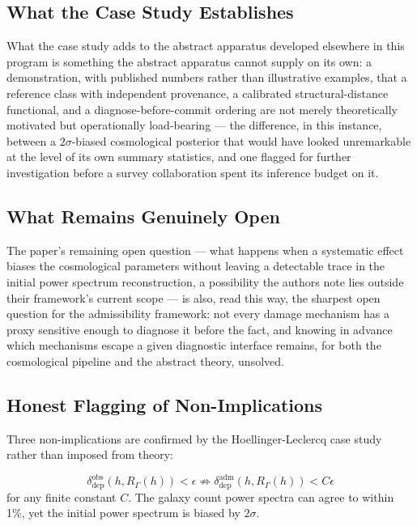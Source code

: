 \documentclass[11pt]{article}
\newcommand{\RGam}{R_\Gamma}
\newcommand{\dobs}{\delta_{\mathrm{dep}}^{\mathrm{obs}}}
\newcommand{\dadm}{\delta_{\mathrm{dep}}^{\mathrm{adm}}}
\begin{document}
\subsection{What the Case Study Establishes}

What the case study adds to the abstract apparatus developed elsewhere in this program is something the abstract apparatus cannot supply on its own: a demonstration, with published numbers rather than illustrative examples, that a reference class with independent provenance, a calibrated structural-distance functional, and a diagnose-before-commit ordering are not merely theoretically motivated but operationally load-bearing --- the difference, in this instance, between a $2\sigma$-biased cosmological posterior that would have looked unremarkable at the level of its own summary statistics, and one flagged for further investigation before a survey collaboration spent its inference budget on it.

\subsection{What Remains Genuinely Open}

The paper's remaining open question --- what happens when a systematic effect biases the cosmological parameters without leaving a detectable trace in the initial power spectrum reconstruction, a possibility the authors note lies outside their framework's current scope --- is also, read this way, the sharpest open question for the admissibility framework: not every damage mechanism has a proxy sensitive enough to diagnose it before the fact, and knowing in advance which mechanisms escape a given diagnostic interface remains, for both the cosmological pipeline and the abstract theory, unsolved.

\subsection{Honest Flagging of Non-Implications}

Three non-implications are confirmed by the Hoellinger-Leclercq case study rather than imposed from theory:

\begin{proposition}
\[
\dobs(h, \RGam(h)) < \epsilon \not\Rightarrow \dadm(h, \RGam(h)) < C\epsilon
\]
for any finite constant $C$. The galaxy count power spectra can agree to within 1\%, yet the initial power spectrum is biased by $2\sigma$.
\end{proposition}
\end{document}
